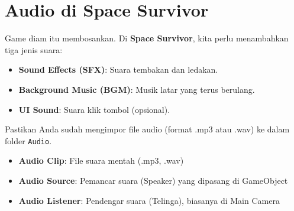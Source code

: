 
\section{Audio di Space Survivor}

Game diam itu membosankan. Di \textbf{Space Survivor}, kita perlu menambahkan tiga jenis suara:
\begin{itemize}
    \item \textbf{Sound Effects (SFX)}: Suara tembakan dan ledakan.
    \item \textbf{Background Music (BGM)}: Musik latar yang terus berulang.
    \item \textbf{UI Sound}: Suara klik tombol (opsional).
\end{itemize}

Pastikan Anda sudah mengimpor file audio (format .mp3 atau .wav) ke dalam folder \texttt{Audio}.

\begin{itemize}
    \item \textbf{Audio Clip}: File suara mentah (.mp3, .wav)
    \item \textbf{Audio Source}: Pemancar suara (Speaker) yang dipasang di GameObject
    \item \textbf{Audio Listener}: Pendengar suara (Telinga), biasanya di Main Camera
\end{itemize}

